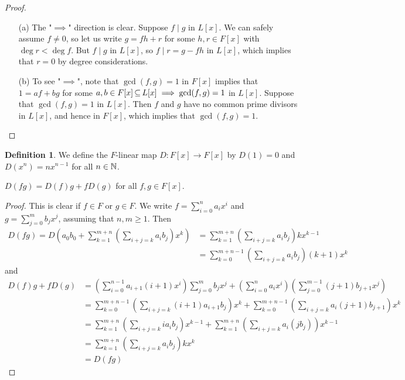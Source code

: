 \documentclass[11pt]{book}
\theoremstyle{definition}   \newtheorem{defn}[counter]{Definition} %
\DeclareMathOperator{\ra}{\rightarrow}   \DeclareMathOperator{\Poly}{\mathbf{P}}   \DeclareMathOperator{\spn}{\textnormal{span}}   \DeclareMathOperator{\aut}{\textnormal{Aut}}
\newcommand{\vs}{\vspace{8pt}}   \newcommand{\hs}{\hspace{8pt}}
\numberwithin{counter}{chapter}
\begin{document}
 \begin{proof}\ 
 \begin{enumerate}
 \item[(a)] The "$\implies$" direction is clear. Suppose $f \mid g$ in $L[x]$. We can safely assume $f \ne 0$, so let us write $g = fh + r$ for some $h,r \in F[x]$ with $\deg r < \deg f$. But $f \mid g$ in $L[x]$, so $f \mid r = g-fh$ in $L[x]$, which implies that $r = 0$ by degree considerations. 
 
 \item[(b)] To see "$\implies$", note that $\gcd(f,g) = 1$ in $F[x]$ implies that $1 = af + bg$ for some $a,b \in F[x] \operatorname{\subseteq} L[x] \implies \gcd(f,g) = 1$ in $L[x]$. Suppose that $\gcd(f,g) = 1$ in $L[x]$. Then $f$ and $g$ have no common prime divisors in $L[x]$, and hence in $F[x]$, which implies that $\gcd(f,g) = 1$. 
 \end{enumerate}
 \end{proof}
 
 \vs
 
 \begin{defn}
 We define the $F$-linear map $D : F[x] \ra F[x]$ by $D(1) = 0$ and $D(x^n) = n x^{n-1}$ for all $n \in \operatorname{\mathbb{N}}$. 
 \end{defn}

\vs

\begin{lemma}
$D(fg) = D(f)g + fD(g)$ for all $f,g \in F[x]$. 
\end{lemma}

\begin{proof}
This is clear if $f \in F$ or $g \in F$. We write $f = \sum_{i=0}^n a_i x^i$ and $g = \sum_{j=0}^m b_j x^j$, assuming that $n,m \geq 1$. Then
\begin{align*}
D(fg) = D\left(a_0 b_0 + \sum_{k=1}^{m+n} \left( \sum_{i+j=k} a_i b_j\right) x^k\right) &= \sum_{k=1}^{m+n} \left( \sum_{i+j=k} a_i b_j\right) k x^{k-1} \\
&= \sum_{k=0}^{m+n-1} \left(\sum_{i+j=k} a_i b_j\right) (k+1) x^k
\end{align*}
and
\begin{align*}
D(f)g + fD(g) &= \left(\sum_{i=0}^{n-1} a_{i+1}(i+1) x^{i}\right) \sum_{j=0}^m b_j x^j + \left(\sum_{i=0}^n a_i x^i\right) \left(\sum_{j=0}^{m-1} (j+1) b_{j+1}x^j\right) \\
&= \sum_{k=0}^{m+n-1} \left(\sum_{i+j=k} (i+1)a_{i+1} b_j\right)x^k + \sum_{k=0}^{m+n-1} \left(\sum_{i+j=k} a_i (j+1) b_{j+1}\right)x^k \\
&= \sum_{k=1}^{m+n} \left(\sum_{i+j=k} ia_{i} b_j\right)x^{k-1} + \sum_{k=1}^{m+n} \left(\sum_{i+j=k} a_i (j b_{j})\right)x^{k-1} \tag{critical step} \\
&= \sum_{k=1}^{m+n} \left(\sum_{i+j=k} a_i b_j \right) k x^k \\
&= D(fg) 
\end{align*}
\end{proof}
\end{document}

